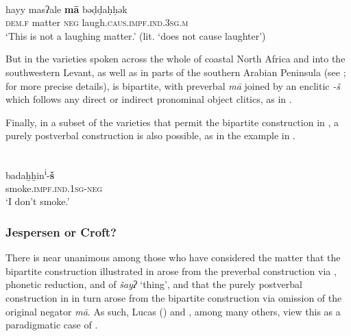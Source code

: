 \documentclass[output=paper]{langsci/langscibook}
\begin{document}
\ea\label{dam}
{         \citep[328]{Cowell1964}}\\
\gll hayy masʔale \textbf{mā} bəḍḍaḥḥək\\
     \textsc{dem.f} matter \textsc{neg} laugh.\textsc{caus.impf.ind.3sg.m}\\
\glt ‘This is not a laughing matter.’ (lit. ‘does not cause laughter’)
\z

But in the varieties spoken across the whole of coastal North Africa and into the southwestern Levant, as well as in parts of the southern Arabian Peninsula (see \citealt{Diem2014}; \citealt{Lucas2018} for more precise details),  is bipartite, with preverbal \textit{mā} joined by an enclitic \textit{-š} which follows any direct or indirect pronominal object clitics, as in .

Finally, in a subset of the varieties that permit the bipartite construction in , a purely postverbal construction is also possible, as in the   example in .

\ea\label{pal}
{         \citep[147]{Seeger2013grammar}}\\
\gll badaḫḫin\textsuperscript{i}-\textbf{š}\\
     smoke.\textsc{impf.ind.1sg-neg}\\
\glt ‘I don’t smoke.’
\z




\subsubsection{Jespersen or Croft?}\label{sec:jesp}



There is near unanimous  among those who have considered the matter that the bipartite construction illustrated in  arose from the preverbal construction via , phonetic reduction, and  of \textit{šayʔ} ‘thing’, and that the purely postverbal construction in  in turn arose from the bipartite construction via omission of the original negator \textit{mā}. As such, Lucas (\citeyear{Lucas2007,Lucas2009,Lucas2018}) and \citet{Diem2014}, among many others, view this as a paradigmatic case of .
\end{document}
